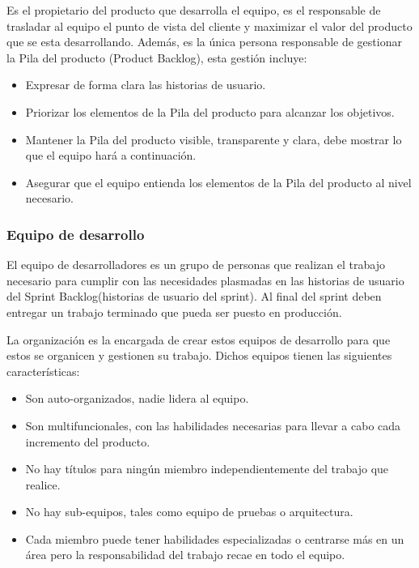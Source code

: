 Es el propietario del producto que desarrolla el equipo, es el responsable de trasladar al equipo el punto de vista del cliente y maximizar
el valor del producto que se esta desarrollando. Además, es la única persona responsable de gestionar la Pila del producto (Product Backlog), 
esta gestión incluye:

\begin{itemize}
	\item Expresar de forma clara las historias de usuario.
	\item Priorizar los elementos de la Pila del producto para alcanzar los objetivos.
	\item Mantener la Pila del producto visible, transparente y clara, debe mostrar lo que el equipo hará a continuación.
	\item Asegurar que el equipo entienda los elementos de la Pila del producto al nivel necesario.
\end{itemize}

\subsubsection{Equipo de desarrollo}

El equipo de desarrolladores es un grupo de personas que realizan el trabajo necesario para cumplir con las
necesidades plasmadas en las historias de usuario del Sprint Backlog(historias de usuario del sprint). Al final 
del sprint deben entregar un trabajo terminado que pueda ser puesto en producción.

La organización es la encargada de crear estos equipos de desarrollo para que estos se organicen y gestionen 
su trabajo. Dichos equipos tienen las siguientes características:

\begin{itemize}
	\item Son auto-organizados, nadie lidera al equipo.
	\item Son multifuncionales, con las habilidades necesarias para llevar a cabo cada incremento del producto.
	\item No hay títulos para ningún miembro independientemente del trabajo que realice.
	\item No hay sub-equipos, tales como equipo de pruebas o arquitectura.
	\item Cada miembro puede tener habilidades especializadas o centrarse más en un área pero la responsabilidad
	del trabajo recae en todo el equipo.
\end{itemize}

